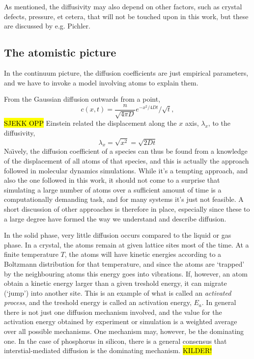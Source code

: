 \documentclass[11pt,bibliography=totoc,index=totoc]{scrbook}   %
\newcommand{\comment}[1]{\hl{#1}}
\begin{document}
As mentioned, the diffusivity may also depend on other factors, such as crystal defects, pressure, et cetera, that will not be touched upon in this work, but these are discussed by e.g. Pichler.\cite{Pichler:2004}

\subsection{The atomistic picture}

In the continuum picture, the diffusion coefficients are just empirical parameters, and we have to invoke a model involving atoms to explain them.

From the Gaussian diffusion outwards from a point,
\begin{equation}
    c(x,t) = \frac{n}{\sqrt{4\pi D}} e^{-x^2/4Dt} / \sqrt{t},
\end{equation}
\comment{SJEKK OPP}
Einstein related the displacement along the $x$ axis, $\lambda_x$, to the diffusivity\cite{Einstein:1905},
\begin{equation}
    \lambda_x = \sqrt{x^2} = \sqrt{2Dt}
  \label{eq:einsteinRelationSimple}
\end{equation}
Na\"{\i}vely, the diffusion coefficient of a species can thus be found from a knowledge of the displacement of all atoms of that species,
and this is actually the approach followed in molecular dynamics simulations.
While it's a tempting approach, and also the one followed in this work, it should not come to a surprise that simulating a large number of atoms over a sufficient amount of time is a computationally demanding task, and for many systems it's just not feasible. 
A short discussion of other approaches is therefore in place, especially since these to a large degree have formed the way we understand and describe diffusion.

In the solid phase, very little diffusion occurs compared to the liquid or gas phase. 
In a crystal, the atoms remain at given lattice sites most of the time.
At a finite temperature $T$, the atoms will have kinetic energies according to a Boltzmann distribution for that temperature,
and since the atoms are `trapped' by the neighbouring atoms this energy goes into vibrations. 
If, however, an atom obtain a kinetic energy larger than a given treshold energy, it can migrate (`jump') into another site.
This is an example of what is called an \emph{activated process}, and the treshold energy is called an activation energy, $E_a$.
In general there is not just one diffusion mechanism involved, and the value for the activation energy obtained by experiment or simulation is a weighted average over all possible mechanisms.
One mechanism may, however, be the dominating one. In the case of phosphorus in silicon, there is a general consensus that interstial-mediated diffusion is the dominating mechanism. \comment{KILDER!}
\end{document}
